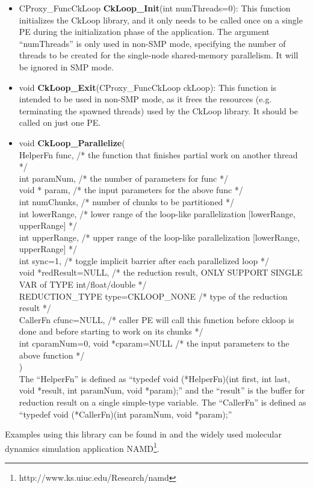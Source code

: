 \begin{itemize}
\item CProxy\_FuncCkLoop \textbf{CkLoop\_Init}(int
numThreads=0): This function initializes the CkLoop library, and it only needs
to be called once on a single PE during the initialization phase of the
application.  The argument ``numThreads'' is only used in non-SMP mode,
specifying the number of threads to be created for the single-node shared-memory
parallelism. It will be ignored in SMP mode.

\item void \textbf{CkLoop\_Exit}(CProxy\_FuncCkLoop ckLoop): This function is
intended to be used in non-SMP mode, as it frees the resources
(e.g. terminating the spawned threads) used by the CkLoop library. It should
be called on just one PE.

\item void \textbf{CkLoop\_Parallelize}( \\
HelperFn func, /* the function that finishes partial work on another thread */ \\
int paramNum, /* the number of parameters for func */\\
void * param, /* the input parameters for the above func */ \\
int numChunks, /* number of chunks to be partitioned */ \\
int lowerRange, /* lower range of the loop-like parallelization [lowerRange, upperRange] */ \\
int upperRange, /* upper range of the loop-like parallelization [lowerRange, upperRange] */ \\
int sync=1, /* toggle implicit barrier after each parallelized loop */ \\
void *redResult=NULL, /* the reduction result, ONLY SUPPORT SINGLE VAR of TYPE int/float/double */ \\
REDUCTION\_TYPE type=CKLOOP\_NONE /* type of the reduction result */ \\
CallerFn cfunc=NULL, /* caller PE will call this function before ckloop is done and before starting to work on its chunks */ \\
int cparamNum=0, void *cparam=NULL /* the input parameters to the above function */ \\
) \\
The ``HelperFn'' is defined as ``typedef void (*HelperFn)(int first, int last, void *result, int paramNum, void *param);''
and the ``result'' is the buffer for reduction result on a single simple-type variable.
The ``CallerFn'' is defined as ``typedef void (*CallerFn)(int paramNum, void *param);''
\end{itemize}

Examples using this library can be found in  and the
widely used molecular dynamics simulation application
NAMD\footnote{http://www.ks.uiuc.edu/Research/namd}.



